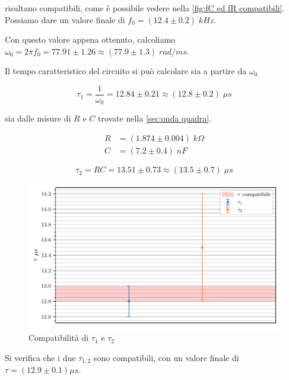 \documentclass[11pt, a4paper]{article}
\numberwithin{equation}{section} %
\begin{document}
risultano compatibili, come è possibile vedere nella \autoref{fig:fC ed fR compatibili}. Possiamo dare un valore finale di $f_{0} = (12.4 \pm 0.2) \; kHz$.

Con questo valore appena ottenuto, calcoliamo $\omega_{0} = 2 \pi f_{0} = 77.91 \pm 1.26 \approx (77.9 \pm 1.3) \; rad/ms$.

Il tempo caratteristico del circuito si può calcolare sia a partire da $\omega_{0}$

\begin{equation*}
    \tau_{1} = \frac{1}{\omega_{0}} = 12.84 \pm 0.21 \approx (12.8 \pm 0.2) \; \mu s
\end{equation*}

sia dalle misure di $R$ e $C$ trovate nella \autoref{sec:onda quadra}.

\begin{align*}
    R &= (1.874 \pm 0.004) \; \unit{k\Omega} \\
    C &= (7.2 \pm 0.4) \; \unit{nF}
\end{align*}

\begin{equation*}
    \tau_{2} = RC = 13.51 \pm 0.73 \approx (13.5 \pm 0.7) \; \mu s
\end{equation*}

\newpage

\begin{figure}[ht!]
    \includegraphics{tau_compatibili.pdf}
    \caption{Compatibilità di $\tau_{1}$ e $\tau_{2}$}
    \label{fig:tau compatibili}
\end{figure}
 
Si verifica che i due $\tau_{1,2}$ sono compatibili, con un valore finale di $\tau = (12.9 \pm 0.1) \mu s$.

\end{document}
